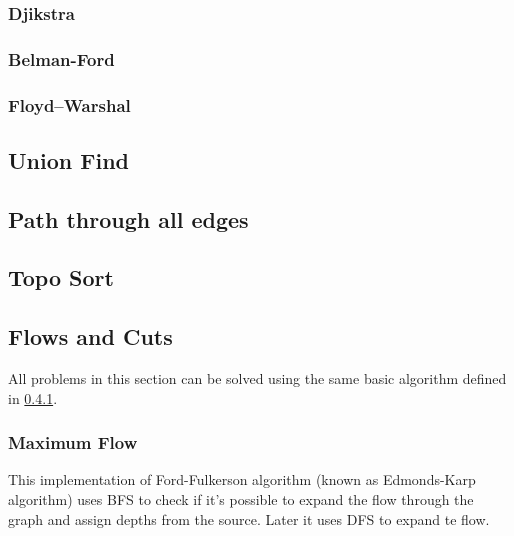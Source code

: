 \documentclass[13pt]{article}
\begin{document}
\subsubsection{Djikstra}

\subsubsection{Belman-Ford}

\subsubsection{Floyd–Warshal}


\subsection{Union Find}\label{sub:union_find} %


\subsection{Path through all edges}\label{sub:} %




\subsection{Topo Sort}\label{sub:topo_sort} %


\subsection{Flows and Cuts}
All problems in this section can be solved using the same basic algorithm defined in \ref{sec:MAXFLOW}.

\subsubsection{Maximum Flow}
\label{sec:MAXFLOW}
This implementation of Ford-Fulkerson algorithm (known as Edmonds-Karp algorithm) uses BFS to check if it's possible to expand the flow through the graph and assign depths from the source. Later it uses DFS to expand te flow.

\end{document}
